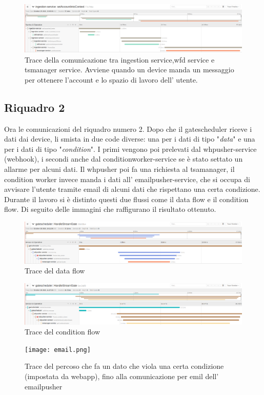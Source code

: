 \documentclass[a4paper,12pt,titlepage,italian,openany]{report}
\begin{document}
\begin{figure}[H]
    \includegraphics[scale=0.21]{75.png}
    \centering
    \caption{Trace della comunicazione tra ingestion service,wfd service e tsmanager service. Avviene quando un device manda un messaggio per ottenere l'account e lo spazio di lavoro dell' utente.}
\end{figure}
\subsection{Riquadro 2}
Ora le comunicazioni del riquadro numero 2. Dopo che il gatescheduler riceve i dati dai device, li smista in due code diverse: una per i dati di tipo "\textit{data}" e una per i dati di tipo "\textit{condition}". I primi vengono poi prelevati dal whpusher-service (webhook), i secondi anche dal conditionworker-service se è stato settato un  allarme per alcuni dati. Il whpusher poi fa una richiesta al tsamanager, il condition worker invece manda i dati all' emailpusher-service, che si occupa di avvisare l'utente tramite email di alcuni dati che rispettano una certa condizione.
\\Durante il lavoro si è distinto questi due flussi come il data flow e il condition flow. Di seguito delle immagini che raffigurano il risultato ottenuto.

\begin{figure}[H]
    \includegraphics[scale=0.21]{76.png}
    \centering
    \caption{Trace del data flow}
\end{figure}
\begin{figure}[H]
    \includegraphics[scale=0.21]{77.png}
    \centering
    \caption{Trace del condition flow}
\end{figure}
\begin{figure}[H]
    \texttt{[image: email.png]}
    \centering
    \caption{Trace del percoso che fa un dato che viola una certa condizione (impostata da webapp), fino alla comunicazione per emil dell' emailpusher}
\end{figure}
\end{document}
